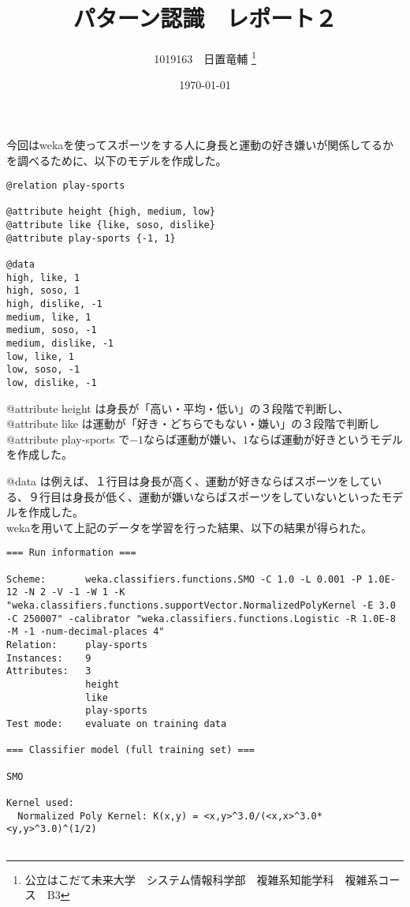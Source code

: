 \documentclass[dvipdfmx,uplatex]{jsarticle}
\title{パターン認識　レポート２}
\author{1019163　日置竜輔 \thanks{公立はこだて未来大学　システム情報科学部　複雑系知能学科　複雑系コース　B3}}
\date{\today}
\begin{document}
\begin{spacing}{1.4}

\maketitle

今回はwekaを使ってスポーツをする人に身長と運動の好き嫌いが関係してるかを調べるために、以下のモデルを作成した。\\

\begin{lstlisting}[caption=今回wekaを用いて3*3で学習させるモデル]
@relation play-sports

@attribute height {high, medium, low}
@attribute like {like, soso, dislike}
@attribute play-sports {-1, 1}

@data
high, like, 1
high, soso, 1
high, dislike, -1
medium, like, 1
medium, soso, -1
medium, dislike, -1
low, like, 1
low, soso, -1
low, dislike, -1
\end{lstlisting}

@attribute height は身長が「高い・平均・低い」の３段階で判断し、\\
@attribute like は運動が「好き・どちらでもない・嫌い」の３段階で判断し\\
@attribute play-sports で$-1$ならば運動が嫌い、$1$ならば運動が好きというモデルを作成した。\\

\newpage

@data は例えば、１行目は身長が高く、運動が好きならばスポーツをしている、９行目は身長が低く、運動が嫌いならばスポーツをしていないといったモデルを作成した。\\

wekaを用いて上記のデータを学習を行った結果、以下の結果が得られた。
\begin{lstlisting}[caption=wekaを用いて上記のデータを学習させた結果]
=== Run information ===

Scheme:       weka.classifiers.functions.SMO -C 1.0 -L 0.001 -P 1.0E-12 -N 2 -V -1 -W 1 -K "weka.classifiers.functions.supportVector.NormalizedPolyKernel -E 3.0 -C 250007" -calibrator "weka.classifiers.functions.Logistic -R 1.0E-8 -M -1 -num-decimal-places 4"
Relation:     play-sports
Instances:    9
Attributes:   3
              height
              like
              play-sports
Test mode:    evaluate on training data

=== Classifier model (full training set) ===

SMO

Kernel used:
  Normalized Poly Kernel: K(x,y) = <x,y>^3.0/(<x,x>^3.0*<y,y>^3.0)^(1/2)


\end{lstlisting}
\end{spacing}
\end{document}
